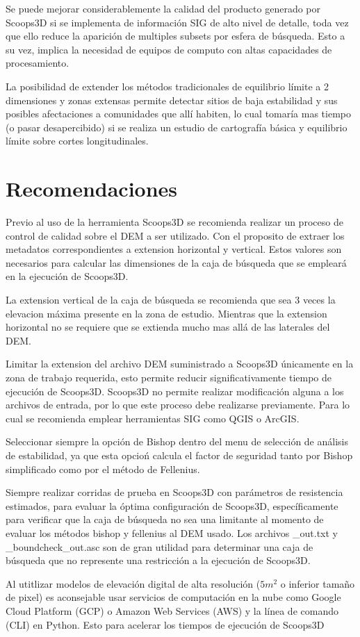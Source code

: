 Se puede mejorar considerablemente la calidad del producto generado por Scoops3D si se implementa de informaci\'on SIG de alto nivel de detalle, toda vez que ello reduce la aparici\'on de multiples subsets por esfera de b\'usqueda. Esto a su vez, implica la necesidad de equipos de computo con altas capacidades de procesamiento.


La posibilidad de extender los m\'etodos tradicionales de equilibrio l\'imite a 2 dimensiones y zonas extensas permite detectar sitios de baja estabilidad y sus posibles afectaciones a comunidades que all\'i habiten, lo cual tomar\'ia mas tiempo (o pasar desapercibido) si se realiza un estudio de cartograf\'ia b\'asica y equilibrio l\'imite sobre cortes longitudinales.


\section{Recomendaciones}

Previo al uso de la herramienta Scoops3D se recomienda  realizar un proceso de control de calidad sobre el DEM a ser utilizado. Con el proposito de extraer los metadatos correspondientes a extension horizontal y vertical. Estos valores son necesarios para calcular las dimensiones de la caja de b\'usqueda que se emplear\'a en la ejecuci\'on de Scoops3D.

La extension vertical de la caja de b\'usqueda se recomienda que sea 3 veces la elevacion m\'axima presente en la zona de estudio. Mientras que la extension horizontal no se requiere que se extienda mucho mas all\'a de las laterales del DEM.
  
Limitar la extension del archivo DEM suministrado a  Scoops3D \'unicamente en la zona de trabajo requerida, esto permite reducir significativamente tiempo de ejecuci\'on de Scoops3D. Scoops3D no permite realizar modificaci\'on alguna a los archivos de entrada, por lo que este proceso debe realizarse previamente. Para lo cual se recomienda emplear herramientas SIG como QGIS o ArcGIS.


Seleccionar siempre la opci\'on de Bishop dentro del menu de selecci\'on de an\'alisis de estabilidad, ya que esta opcio\'n calcula el factor de seguridad tanto por Bishop simplificado como por el m\'etodo de Fellenius.

Siempre realizar corridas de prueba en Scoops3D con par\'ametros de resistencia estimados, para evaluar la \'optima configuraci\'on de Scoops3D, espec\'ificamente para verificar que la caja de b\'usqueda no sea una limitante al momento de evaluar los m\'etodos bishop y fellenius al DEM usado. Los archivos \_out.txt y \_boundcheck\_out.asc son de gran utilidad para determinar una caja de b\'usqueda que no represente una restricci\'on a la ejecuci\'on de Scoops3D.



Al utitlizar modelos de elevaci\'on digital de alta resoluci\'on ($5m^{2}$ o inferior tama\~no de pixel) es aconsejable usar servicios de computaci\'on en la nube como Google Cloud Platform (GCP) o Amazon Web Services (AWS) y la l\'inea de comando (CLI) en Python. Esto para acelerar los tiempos de ejecuci\'on de Scoops3D